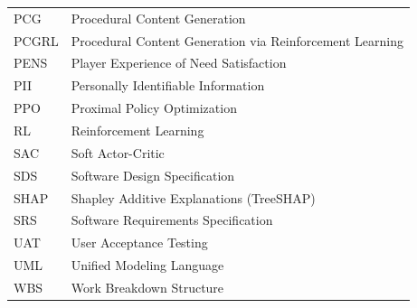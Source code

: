 \begin{longtable}{ll}
PCG & Procedural Content Generation \\
PCGRL & Procedural Content Generation via Reinforcement Learning \\
PENS & Player Experience of Need Satisfaction \\
PII & Personally Identifiable Information \\
PPO & Proximal Policy Optimization \\
RL & Reinforcement Learning \\
SAC & Soft Actor-Critic \\
SDS & Software Design Specification \\
SHAP & Shapley Additive Explanations (TreeSHAP) \\
SRS & Software Requirements Specification \\
UAT & User Acceptance Testing \\
UML & Unified Modeling Language \\
WBS & Work Breakdown Structure \\
\bottomrule
\end{longtable}
